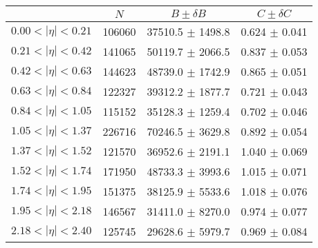 \begin{tabular}{lccc}
\hline
    &   $N$   & $B \pm \delta B$  &  $C \pm \delta C$ \\
\hline
$0.00 < |\eta| <0.21$          & 106060     & 37510.5    $\pm$ 1498.8 & 0.624      $\pm$ 0.041 \\
$0.21 < |\eta| <0.42$          & 141065     & 50119.7    $\pm$ 2066.5 & 0.837      $\pm$ 0.053 \\
$0.42 < |\eta| <0.63$          & 144623     & 48739.0    $\pm$ 1742.9 & 0.865      $\pm$ 0.051 \\
$0.63 < |\eta| <0.84$          & 122327     & 39312.2    $\pm$ 1877.7 & 0.721      $\pm$ 0.043 \\
$0.84 < |\eta| <1.05$          & 115152     & 35128.3    $\pm$ 1259.4 & 0.702      $\pm$ 0.046 \\
$1.05 < |\eta| <1.37$          & 226716     & 70246.5    $\pm$ 3629.8 & 0.892      $\pm$ 0.054 \\
$1.37 < |\eta| <1.52$          & 121570     & 36952.6    $\pm$ 2191.1 & 1.040      $\pm$ 0.069 \\
$1.52 < |\eta| <1.74$          & 171950     & 48733.3    $\pm$ 3993.6 & 1.015      $\pm$ 0.071 \\
$1.74 < |\eta| <1.95$          & 151375     & 38125.9    $\pm$ 5533.6 & 1.018      $\pm$ 0.076 \\
$1.95 < |\eta| <2.18$          & 146567     & 31411.0    $\pm$ 8270.0 & 0.974      $\pm$ 0.077 \\
$2.18 < |\eta| <2.40$          & 125745     & 29628.6    $\pm$ 5979.7 & 0.969      $\pm$ 0.084 \\
\hline
\end{tabular}
